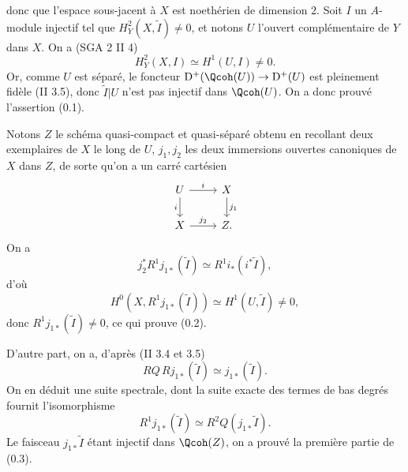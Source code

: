 donc que l'espace sous-jacent à $X$ est noethérien de dimension $2$. Soit $I$ un $A$-module injectif tel que $H^2_Y(X,\widetilde I)\ne0$, et notons $U$ l'ouvert complémentaire de $Y$ dans $X$. On a (SGA 2 II 4)
\[
 H^2_Y(X,I)\simeq H^1(U,I)\ne0.
\]
Or, comme $U$ est séparé, le foncteur $\mathrm D^+(\Qcoh(U))\to\mathrm D^+(U)$ est pleinement fidèle (II 3.5), donc $\widetilde I|U$ n'est pas injectif dans $\Qcoh(U)$. On a donc prouvé l'assertion (0.1).

Notons $Z$ le schéma quasi-compact et quasi-séparé obtenu en recollant deux exemplaires de $X$ le long de $U$, $j_1,j_2$ les deux immersions ouvertes canoniques de $X$ dans $Z$, de sorte qu'on a un carré cartésien
\[
\begin{tikzcd}
 U \arrow[r,"i"] \arrow[d,"i"'] & X \arrow[d,"j_1"]\\
 X \arrow[r,"j_2"] & Z .
\end{tikzcd}
\]
On a
\[
 j_2^*R^1j_{1*}(\widetilde I)\simeq R^1i_*(i^*\widetilde I),
\]
d'où
\[
 H^0(X,R^1j_{1*}(\widetilde I))\simeq H^1(U,\widetilde I)\ne0,
\]
donc $R^1j_{1*}(\widetilde I)\ne0$, ce qui prouve (0.2).

D'autre part, on a, d'après (II 3.4 et 3.5)
\[
 RQ\,Rj_{1*}(\widetilde I)\simeq j_{1*}(\widetilde I).
\]
On en déduit une suite spectrale, dont la suite exacte des termes de bas degrés fournit l'isomorphisme
\[
 R^1j_{1*}(\widetilde I)\simeq R^2Q(j_{1*}\widetilde I).
\]
Le faisceau $j_{1*}\widetilde I$ étant injectif dans $\Qcoh(Z)$, on a prouvé la première partie de (0.3).

